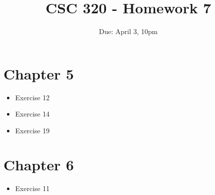 \documentclass[12pt]{article}
\title{CSC 320 - Homework 7}
\author{}
\date{Due: April 3, 10pm}
\begin{document}

\section{Chapter 5}

\begin{itemize}
    \item Exercise 12
    \item Exercise 14
    \item Exercise 19
\end{itemize}

\section{Chapter 6}
\begin{itemize}
    \item Exercise 11
\end{itemize}
\end{document}
